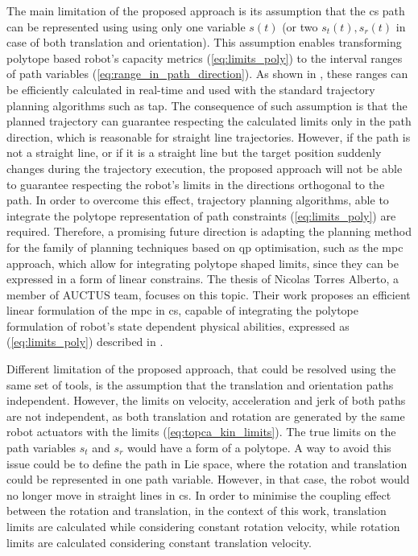 The main limitation of the proposed approach is its assumption that the \gls{cs} path can be represented using using only one variable $s(t)$ (or two $s_t(t),s_r(t)$ in case of both translation and orientation). 
This assumption enables transforming polytope based robot's capacity metrics (\ref{eq:limits_poly}) to the interval ranges of path variables (\ref{eq:range_in_path_direction}). As shown in , these ranges can be efficiently calculated in real-time and used with the standard trajectory planning algorithms such as \gls{tap}.  
The consequence of such assumption is that the planned trajectory can guarantee respecting the calculated limits only in the path direction, which is reasonable for straight line trajectories. However, if the path is not a straight line, or if it is a straight line but the target position suddenly changes during the trajectory execution, the proposed approach will not be able to guarantee respecting the robot's limits in the directions orthogonal to the path. In order to overcome this effect, trajectory planning algorithms, able to integrate the polytope representation of path constraints (\ref{eq:limits_poly}) are required. Therefore, a promising future direction is adapting the planning method for the family of planning techniques based on \gls{qp} optimisation, such as the \gls{mpc} approach, which allow for integrating polytope shaped limits, since they can be expressed in a form of linear constrains. The thesis of Nicolas Torres Alberto, a member of AUCTUS team, focuses on this topic. Their work proposes an efficient linear formulation of the \gls{mpc} in \gls{cs}, capable of integrating the polytope formulation of robot's state dependent physical abilities, expressed as (\ref{eq:limits_poly}) described in . 

Different limitation of the proposed approach, that could be resolved using the same set of tools, is the assumption that the translation and orientation paths independent. However, the limits on velocity, acceleration and jerk of both paths are not independent, as both translation and rotation are generated by the same robot actuators with the limits (\ref{eq:topca_kin_limits}). The true limits on the path variables $s_t$ and $s_r$ would have a form of a polytope. A way to avoid this issue could be to define the path in Lie space, where the rotation and translation could be represented in one path variable. However, in that case, the robot would no longer move in straight lines in \gls{cs}. In order to minimise the coupling effect between the rotation and translation, in the context of this work, translation limits are calculated while considering constant rotation velocity, while rotation limits are calculated considering constant translation velocity. 

